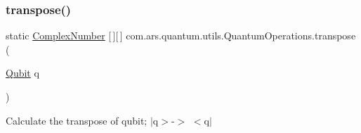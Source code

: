 \subsubsection{\texorpdfstring{transpose()}{transpose()}\hspace{0.1cm}{\footnotesize\ttfamily [1/2]}}
{\footnotesize\ttfamily static \hyperlink{classcom_1_1ars_1_1complexnumbers_1_1_complex_number}{Complex\+Number} \mbox{[}$\,$\mbox{]}\mbox{[}$\,$\mbox{]} com.\+ars.\+quantum.\+utils.\+Quantum\+Operations.\+transpose (\begin{DoxyParamCaption}\item[{\hyperlink{classcom_1_1ars_1_1qubits_1_1_qubit}{Qubit}}]{q }\end{DoxyParamCaption})\hspace{0.3cm}{\ttfamily [static]}}

Calculate the transpose of qubit; $\vert$q$>$-\/$>$ $<$q$\vert$


